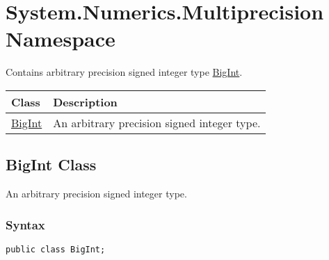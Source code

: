 \documentclass[a4paper,oneside,11.000000pt]{book}
\newcounter{subchapter}
\begin{document}
\hypertarget{System.Numerics.Multiprecision}{\chapter{System.Numerics.Multiprecision Namespace}}
\begin{flushleft}
Contains arbitrary precision signed integer type \hyperlink{System.Numerics.Multiprecision.BigInt}{BigInt}.

\end{flushleft}
\clearpage
{}
\begin{flushleft}
\begin{supertabular}[l]{ll}
\textbf{Class}
& \textbf{Description}
\\
\hline
\hyperlink{System.Numerics.Multiprecision.BigInt}{BigInt}
& An arbitrary precision signed integer type.

\\
\end{supertabular}

\end{flushleft}
\clearpage

\hypertarget{System.Numerics.Multiprecision.BigInt}{\section{BigInt Class}}\begin{flushleft}
An arbitrary precision signed integer type.

\end{flushleft}

\subsection*{Syntax}\texttt{public class BigInt;}
\end{document}
